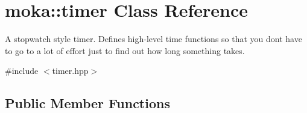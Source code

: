 \hypertarget{classmoka_1_1timer}{}\section{moka\+::timer Class Reference}
\label{classmoka_1_1timer}


A stopwatch style timer. Defines high-\/level time functions so that you don\textquotesingle{}t have to go to a lot of effort just to find out how long something takes.  




{\ttfamily \#include $<$timer.\+hpp$>$}

\subsection*{Public Member Functions}
